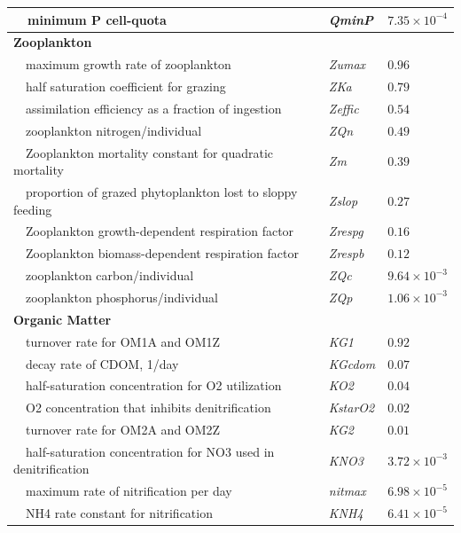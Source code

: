 \documentclass[letterpaper,12pt,oneside]{article}\usepackage[]{graphicx}\usepackage[]{color}
\begin{document}
\begin{table}[!tbp]
{\begin{center}
\begin{tabular}{lll}
~~minimum P cell-quota&\textit{QminP}&$7.35\times 10^{-4}$\tabularnewline
\hline
{\bfseries Zooplankton}&&\tabularnewline
~~maximum growth rate of zooplankton&\textit{Zumax}&$0.96$\tabularnewline
~~half saturation coefficient for grazing&\textit{ZKa}&$0.79$\tabularnewline
~~assimilation efficiency as a fraction of ingestion&\textit{Zeffic}&$0.54$\tabularnewline
~~zooplankton nitrogen/individual&\textit{ZQn}&$0.49$\tabularnewline
~~Zooplankton mortality constant for quadratic mortality&\textit{Zm}&$0.39$\tabularnewline
~~proportion of grazed phytoplankton lost to sloppy feeding&\textit{Zslop}&$0.27$\tabularnewline
~~Zooplankton growth-dependent respiration factor&\textit{Zrespg}&$0.16$\tabularnewline
~~Zooplankton biomass-dependent respiration factor&\textit{Zrespb}&$0.12$\tabularnewline
~~zooplankton carbon/individual&\textit{ZQc}&$9.64\times 10^{-3}$\tabularnewline
~~zooplankton phosphorus/individual&\textit{ZQp}&$1.06\times 10^{-3}$\tabularnewline
\hline
{\bfseries Organic Matter}&&\tabularnewline
~~turnover rate for OM1A and OM1Z&\textit{KG1}&$0.92$\tabularnewline
~~decay rate of CDOM, 1/day&\textit{KGcdom}&$0.07$\tabularnewline
~~half-saturation concentration for O2 utilization&\textit{KO2}&$0.04$\tabularnewline
~~O2 concentration that inhibits denitrification&\textit{KstarO2}&$0.02$\tabularnewline
~~turnover rate for OM2A and OM2Z&\textit{KG2}&$0.01$\tabularnewline
~~half-saturation concentration for NO3 used in denitrification&\textit{KNO3}&$3.72\times 10^{-3}$\tabularnewline
~~maximum rate of nitrification per day&\textit{nitmax}&$6.98\times 10^{-5}$\tabularnewline
~~NH4 rate constant for nitrification&\textit{KNH4}&$6.41\times 10^{-5}$\tabularnewline
\hline
\end{tabular}\end{center}}

\end{table}
\end{document}
